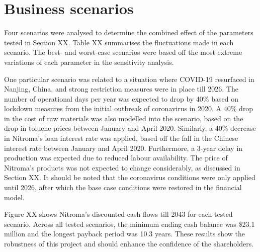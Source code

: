 \section{Business scenarios}
Four scenarios were analysed to determine the combined effect of the parameters tested in Section XX. Table XX summarises the fluctuations made in each scenario. The best- and worst-case scenarios were based off the most extreme variations of each parameter in the sensitivity analysis. 

One particular scenario was related to a situation where COVID-19 resurfaced in Nanjing, China, and strong restriction measures were in place till 2026. The number of operational days per year was expected to drop by 40\% based on lockdown measures from the initial outbreak of coronavirus in 2020. A 40\% drop in the cost of raw materials was also modelled into the scenario, based on the drop in toluene prices between January and April 2020. Similarly, a 40\% decrease in Nitroma’s loan interest rate was applied, based off the fall in the Chinese interest rate between January and April 2020. Furthermore, a 3-year delay in production was expected due to reduced labour availability. The price of Nitroma’s products was not expected to change considerably, as discussed in Section XX. It should be noted that the coronavirus conditions were only applied until 2026, after which the base case conditions were restored in the financial model.

Figure XX shows Nitroma’s discounted cash flows till 2043 for each tested scenario. Across all tested scenarios, the minimum ending cash balance was \$23.1 million and the longest payback period was 10.3 years. These results show the robustness of this project and should enhance the confidence of the shareholders.
